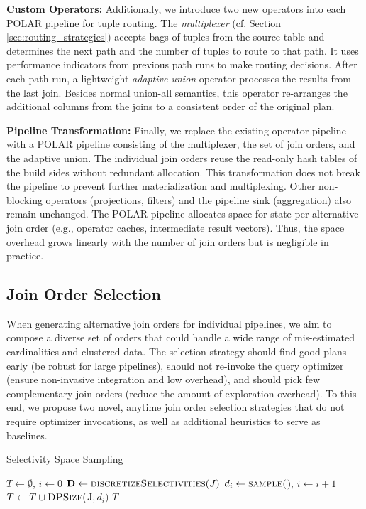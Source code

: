\textbf{Custom Operators:} Additionally, we introduce two new operators into each POLAR pipeline for tuple routing. The \emph{multiplexer} (cf. Section \ref{sec:routing_strategies}) accepts bags of tuples from the source table and determines the next path and the number of tuples to route to that path. It uses performance indicators from previous path runs to make routing decisions. After each path run, a lightweight \emph{adaptive union} operator processes the results from the last join. Besides normal union-all semantics, this operator re-arranges the additional columns from the joins to a consistent order of the original plan.

\textbf{Pipeline Transformation:} Finally, we replace the existing operator pipeline with a POLAR pipeline consisting of the multiplexer, the set of join orders, and the adaptive union. The individual join orders reuse the read-only hash tables of the build sides without redundant allocation. This transformation does not break the pipeline to prevent further materialization and multiplexing. Other non-blocking operators (\eg projections, filters) and the pipeline sink (\eg aggregation) also remain unchanged. The POLAR pipeline allocates space for state per alternative join order (e.g., operator caches, intermediate result vectors). Thus, the space overhead grows linearly with the number of join orders but is negligible in practice.

\vspace{-0.1cm}
\subsection{Join Order Selection}
\label{sec:paths}

When generating alternative join orders for individual pipelines, we aim to compose a diverse set of orders that could handle a wide range of mis-estimated cardinalities and clustered data. The selection strategy should find good plans early (\ie be robust for large pipelines), should not re-invoke the query optimizer (\ie ensure non-invasive integration and low overhead), and should pick few complementary join orders (\ie reduce the amount of exploration overhead). To this end, we propose two novel, anytime join order selection strategies that do not require optimizer invocations, as well as additional heuristics to serve as baselines.

\begin{algorithm}[!t] \small
\caption{Selectivity Space Sampling}\label{alg:enumeration1}
\begin{algorithmic}[1]
\State $T \gets \emptyset$, $i \gets 0$
\State $\mathbf{D} \gets \textsc{discretizeSelectivities}(J)$ 
  \State $d_i \gets \textsc{sample}($$)$, $i \gets i+1$  
	\State $T \gets T \cup \textsc{DPSize}($J$, d_i)$ 
\EndWhile
\State \Return $T$
\end{algorithmic}
\end{algorithm}

